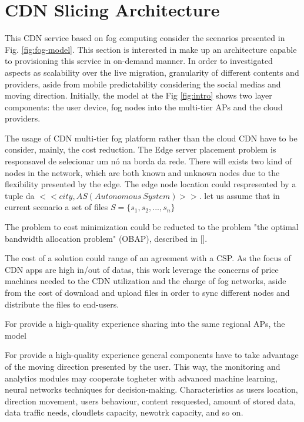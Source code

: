 \section{CDN Slicing Architecture}
\label{sec:cdn-slicing-archi}

This CDN service based on fog computing consider the scenarios presented in Fig. \ref{fig:fog-model}. This section is interested in make up an architecture capable to provisioning this service in on-demand manner. In order to investigated aspects as scalability over the live migration, granularity of different contents and providers, aside from mobile predictability considering the social medias and moving direction. Initially, the model at the Fig \ref{fig:intro} shows two layer components: the user device, fog nodes into the multi-tier APs and the cloud providers. 

The usage of CDN multi-tier fog platform rather than the cloud CDN have to be consider, mainly, the cost reduction.
The Edge server placement problem is responsavel de selecionar um nó na borda da rede. 
There will exists two kind of nodes in the network, which are both known and unknown nodes due to the flexibility presented by the edge. The edge node location could respresented by a tuple da $<< city, AS(Autonomous\ System)>>$. let us assume that in current scenario a set of files $S = \{s_{1}, s_{2}, ..., s_{n}\}$ 

The problem to cost minimization could be reducted to the problem "the optimal bandwidth allocation problem" (OBAP), described in [].

The cost of a solution could range of an agreement with a CSP. As the focus of CDN apps are high in/out of datas, this work leverage the concerns of price machines needed to the CDN utilization and the charge of fog  networks, aside from the cost of download and upload files in order to sync different nodes and distribute the files to end-users.

For provide a high-quality experience sharing into the same regional APs, the model 

For provide a high-quality experience general components have to take advantage of the moving direction presented by the user. This way, the monitoring and analytics modules may cooperate togheter with advanced machine learning, neural networks techniques for decision-making. Characteristics as users location, direction movement, users behaviour, content resquested, amount of stored data, data traffic needs, cloudlets capacity, newotrk capacity, and so on.

